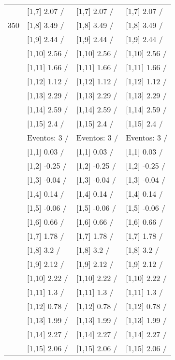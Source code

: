 \begin{table}
\begin{tabular}[t]{llll}
 & {}[1,7] 2.07  / & {}[1,7] 2.07  / & {}[1,7] 2.07  /\\
350 & {}[1,8] 3.49  / & {}[1,8] 3.49  / & {}[1,8] 3.49  /\\
\addlinespace
 & {}[1,9] 2.44  / & {}[1,9] 2.44  / & {}[1,9] 2.44  /\\
 & {}[1,10] 2.56  / & {}[1,10] 2.56  / & {}[1,10] 2.56  /\\
 & {}[1,11] 1.66  / & {}[1,11] 1.66  / & {}[1,11] 1.66  /\\
 & {}[1,12] 1.12  / & {}[1,12] 1.12  / & {}[1,12] 1.12  /\\
 & {}[1,13] 2.29  / & {}[1,13] 2.29  / & {}[1,13] 2.29  /\\
\addlinespace
 & {}[1,14] 2.59  / & {}[1,14] 2.59  / & {}[1,14] 2.59  /\\
 & {}[1,15] 2.4  / & {}[1,15] 2.4  / & {}[1,15] 2.4  /\\
 & Eventos:  3 / & Eventos:  3 / & Eventos:  3 /\\
 & {}[1,1] 0.03  / & {}[1,1] 0.03  / & {}[1,1] 0.03  /\\
 & {}[1,2] -0.25  / & {}[1,2] -0.25  / & {}[1,2] -0.25  /\\
\addlinespace
 & {}[1,3] -0.04  / & {}[1,3] -0.04  / & {}[1,3] -0.04  /\\
 & {}[1,4] 0.14  / & {}[1,4] 0.14  / & {}[1,4] 0.14  /\\
 & {}[1,5] -0.06  / & {}[1,5] -0.06  / & {}[1,5] -0.06  /\\
 & {}[1,6] 0.66  / & {}[1,6] 0.66  / & {}[1,6] 0.66  /\\
 & {}[1,7] 1.78  / & {}[1,7] 1.78  / & {}[1,7] 1.78  /\\
\addlinespace
500 & {}[1,8] 3.2  / & {}[1,8] 3.2  / & {}[1,8] 3.2  /\\
 & {}[1,9] 2.12  / & {}[1,9] 2.12  / & {}[1,9] 2.12  /\\
 & {}[1,10] 2.22  / & {}[1,10] 2.22  / & {}[1,10] 2.22  /\\
 & {}[1,11] 1.3  / & {}[1,11] 1.3  / & {}[1,11] 1.3  /\\
 & {}[1,12] 0.78  / & {}[1,12] 0.78  / & {}[1,12] 0.78  /\\
\addlinespace
 & {}[1,13] 1.99  / & {}[1,13] 1.99  / & {}[1,13] 1.99  /\\
 & {}[1,14] 2.27  / & {}[1,14] 2.27  / & {}[1,14] 2.27  /\\
 & {}[1,15] 2.06  / & {}[1,15] 2.06  / & {}[1,15] 2.06  /\\
\bottomrule
\end{tabular}
\end{table}
